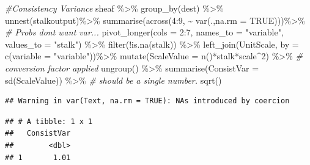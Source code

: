 \documentclass[
]{article}
\newenvironment{Shaded}{\begin{snugshade}}{\end{snugshade}}
\newcommand{\AttributeTok}[1]{\textcolor[rgb]{0.77,0.63,0.00}{#1}}
\newcommand{\CommentTok}[1]{\textcolor[rgb]{0.56,0.35,0.01}{\textit{#1}}}
\newcommand{\ConstantTok}[1]{\textcolor[rgb]{0.00,0.00,0.00}{#1}}
\newcommand{\DecValTok}[1]{\textcolor[rgb]{0.00,0.00,0.81}{#1}}
\newcommand{\FunctionTok}[1]{\textcolor[rgb]{0.00,0.00,0.00}{#1}}
\newcommand{\NormalTok}[1]{#1}
\newcommand{\SpecialCharTok}[1]{\textcolor[rgb]{0.00,0.00,0.00}{#1}}
\newcommand{\StringTok}[1]{\textcolor[rgb]{0.31,0.60,0.02}{#1}}
\begin{document}
\begin{Shaded}
\begin{Highlighting}[]
\CommentTok{\#Consistency Variance}
\NormalTok{sheaf }\SpecialCharTok{\%\textgreater{}\%}
  \FunctionTok{group\_by}\NormalTok{(dest) }\SpecialCharTok{\%\textgreater{}\%}
  \FunctionTok{unnest}\NormalTok{(stalkoutput)}\SpecialCharTok{\%\textgreater{}\%}
  \FunctionTok{summarise}\NormalTok{(}\FunctionTok{across}\NormalTok{(}\DecValTok{4}\SpecialCharTok{:}\DecValTok{9}\NormalTok{, }\SpecialCharTok{\textasciitilde{}} \FunctionTok{var}\NormalTok{(.,}\AttributeTok{na.rm =} \ConstantTok{TRUE}\NormalTok{)))}\SpecialCharTok{\%\textgreater{}\%} \CommentTok{\# Probs dont want var...}
  \FunctionTok{pivot\_longer}\NormalTok{(}\AttributeTok{cols =} \DecValTok{2}\SpecialCharTok{:}\DecValTok{7}\NormalTok{, }\AttributeTok{names\_to =} \StringTok{"variable"}\NormalTok{, }\AttributeTok{values\_to =} \StringTok{"stalk"}\NormalTok{) }\SpecialCharTok{\%\textgreater{}\%}
  \FunctionTok{filter}\NormalTok{(}\SpecialCharTok{!}\FunctionTok{is.na}\NormalTok{(stalk)) }\SpecialCharTok{\%\textgreater{}\%}
  \FunctionTok{left\_join}\NormalTok{(UnitScale, }\AttributeTok{by =} \FunctionTok{c}\NormalTok{(}\AttributeTok{variable =} \StringTok{"variable"}\NormalTok{))}\SpecialCharTok{\%\textgreater{}\%}
  \FunctionTok{mutate}\NormalTok{(}\AttributeTok{ScaleValue =} \FunctionTok{n}\NormalTok{()}\SpecialCharTok{*}\NormalTok{stalk}\SpecialCharTok{*}\NormalTok{scale}\SpecialCharTok{\^{}}\DecValTok{2}\NormalTok{) }\SpecialCharTok{\%\textgreater{}\%} \CommentTok{\# conversion factor applied}
  \FunctionTok{ungroup}\NormalTok{() }\SpecialCharTok{\%\textgreater{}\%}
  \FunctionTok{summarise}\NormalTok{(}\AttributeTok{ConsistVar =} \FunctionTok{sd}\NormalTok{(ScaleValue)) }\SpecialCharTok{\%\textgreater{}\%} \CommentTok{\# should be a single number.}
  \FunctionTok{sqrt}\NormalTok{()}
\end{Highlighting}
\end{Shaded}

\begin{verbatim}
## Warning in var(Text, na.rm = TRUE): NAs introduced by coercion
\end{verbatim}

\begin{verbatim}
## # A tibble: 1 x 1
##   ConsistVar
##        <dbl>
## 1       1.01
\end{verbatim}
\end{document}
